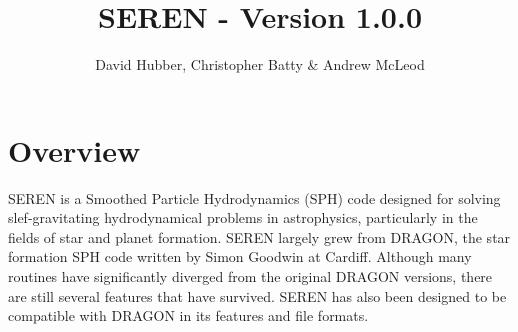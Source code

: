 \documentclass[a4paper]{article}
\newcommand{\NAME}{SEREN }
\begin{document}
\title{\NAME - Version 1.0.0}
\author{David Hubber, Christopher Batty \& Andrew McLeod}

\maketitle

\tableofcontents

\newpage

\section{Overview}
\NAME is a Smoothed Particle Hydrodynamics (SPH) code designed for solving slef-gravitating hydrodynamical problems in astrophysics, particularly in the fields of star and planet formation.  \NAME largely grew from DRAGON, the star formation SPH code written by Simon Goodwin at Cardiff.  Although many routines have significantly diverged from the original DRAGON versions, there are still several features that have survived.  \NAME has also been designed to be compatible with DRAGON in its features and file formats. \newline
\end{document}

